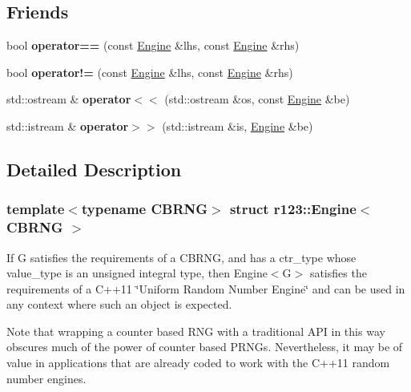 \subsection*{Friends}
\begin{DoxyCompactItemize}
\item 
\hypertarget{structr123_1_1Engine_a606e3ba824542e52f12df1345126e721}{}\label{structr123_1_1Engine_a606e3ba824542e52f12df1345126e721} 
bool {\bfseries operator==} (const \hyperlink{structr123_1_1Engine}{Engine} \&lhs, const \hyperlink{structr123_1_1Engine}{Engine} \&rhs)
\item 
\hypertarget{structr123_1_1Engine_af0947cdcfc03aef7ec30c9fafa660445}{}\label{structr123_1_1Engine_af0947cdcfc03aef7ec30c9fafa660445} 
bool {\bfseries operator!=} (const \hyperlink{structr123_1_1Engine}{Engine} \&lhs, const \hyperlink{structr123_1_1Engine}{Engine} \&rhs)
\item 
\hypertarget{structr123_1_1Engine_ae0321571f689fca00c608d11ecad7d8d}{}\label{structr123_1_1Engine_ae0321571f689fca00c608d11ecad7d8d} 
std\+::ostream \& {\bfseries operator$<$$<$} (std\+::ostream \&os, const \hyperlink{structr123_1_1Engine}{Engine} \&be)
\item 
\hypertarget{structr123_1_1Engine_ae708b771ab5ac17700d34bad875a16d9}{}\label{structr123_1_1Engine_ae708b771ab5ac17700d34bad875a16d9} 
std\+::istream \& {\bfseries operator$>$$>$} (std\+::istream \&is, \hyperlink{structr123_1_1Engine}{Engine} \&be)
\end{DoxyCompactItemize}


\subsection{Detailed Description}
\subsubsection*{template$<$typename C\+B\+R\+NG$>$\newline
struct r123\+::\+Engine$<$ C\+B\+R\+N\+G $>$}

If G satisfies the requirements of a C\+B\+R\+NG, and has a ctr\+\_\+type whose value\+\_\+type is an unsigned integral type, then Engine$<$\+G$>$ satisfies the requirements of a C++11 \char`\"{}\+Uniform Random Number Engine\char`\"{} and can be used in any context where such an object is expected. 

Note that wrapping a counter based R\+NG with a traditional A\+PI in this way obscures much of the power of counter based P\+R\+N\+Gs. Nevertheless, it may be of value in applications that are already coded to work with the C++11 random number engines.


